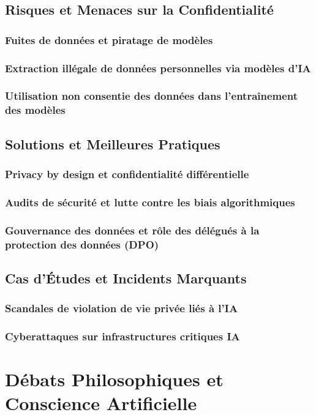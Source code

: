 \documentclass[12pt,a4paper]{book}
\begin{document}
\section{Risques et Menaces sur la Confidentialité}
\subsection{Fuites de données et piratage de modèles}
\subsection{Extraction illégale de données personnelles via modèles d’IA}
\subsection{Utilisation non consentie des données dans l’entraînement des modèles}

\section{Solutions et Meilleures Pratiques}
\subsection{Privacy by design et confidentialité différentielle}
\subsection{Audits de sécurité et lutte contre les biais algorithmiques}
\subsection{Gouvernance des données et rôle des délégués à la protection des données (DPO)}

\section{Cas d’Études et Incidents Marquants}
\subsection{Scandales de violation de vie privée liés à l’IA}
\subsection{Cyberattaques sur infrastructures critiques IA}


\chapter{Débats Philosophiques et Conscience Artificielle}
\end{document}
